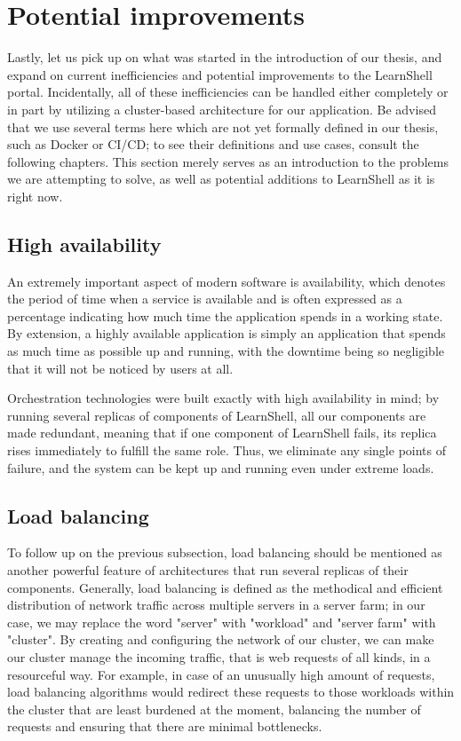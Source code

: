 \documentclass[thesis=B,english]{FITthesis}[2019/12/23]
\begin{document}
\section{Potential improvements}

Lastly, let us pick up on what was started in the introduction of our thesis, and expand on current inefficiencies and potential improvements to the LearnShell portal. Incidentally, all of these inefficiencies can be handled either completely or in part by utilizing a cluster-based architecture for our application. Be advised that we use several terms here which are not yet formally defined in our thesis, such as Docker or CI/CD; to see their definitions and use cases, consult the following chapters. This section merely serves as an introduction to the problems we are attempting to solve, as well as potential additions to LearnShell as it is right now.

\subsection{High availability}

An extremely important aspect of modern software is availability, which denotes the period of time when a service is available and is often expressed as a percentage indicating how much time the application spends in a working state. \cite{what-is-high-availability} By extension, a highly available application is simply an application that spends as much time as possible up and running, with the downtime being so negligible that it will not be noticed by users at all.

Orchestration technologies were built exactly with high availability in mind; by running several replicas of components of LearnShell, all our components are made redundant, meaning that if one component of LearnShell fails, its replica rises immediately to fulfill the same role. Thus, we eliminate any single points of failure, and the system can be kept up and running even under extreme loads.

\subsection{Load balancing}

To follow up on the previous subsection, load balancing should be mentioned as another powerful feature of architectures that run several replicas of their components. Generally, load balancing is defined as the methodical and efficient distribution of network traffic across multiple servers in a server farm; in our case, we may replace the word "server" with "workload" and "server farm" with "cluster". \cite{citrix} By creating and configuring the network of our cluster, we can make our cluster manage the incoming traffic, that is web requests of all kinds, in a resourceful way. For example, in case of an unusually high amount of requests, load balancing algorithms would redirect these requests to those workloads within the cluster that are least burdened at the moment, balancing the number of requests and ensuring that there are minimal bottlenecks.
\end{document}
